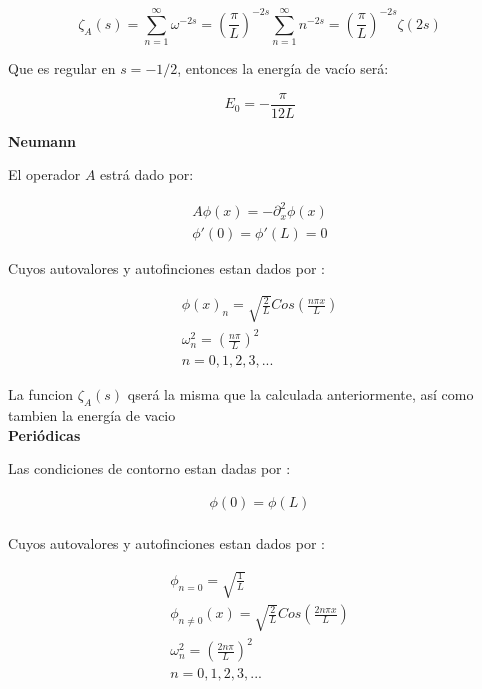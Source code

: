 \begin{equation}
\zeta _A (s) = 
\sum _{n=1} ^{\infty} \omega ^{-2s} =  
\left( \frac{\pi}{L} \right) ^{-2s} \sum _{n=1} ^{\infty} n ^{-2s} = 
\left( \frac{\pi}{L} \right) ^{-2s} \zeta (2s)
\end{equation}

Que es regular en $s=-1/2$, entonces la energía de vacío será:

\begin{equation}
E _0 = - \frac{\pi}{12 L}
\end{equation}

\textbf{Neumann}

El operador $A$ estrá dado por:

\begin{equation}
\begin{array}{c}
	A \phi (x) = - \partial _x ^2 \phi (x) \\
    \phi ' (0) = \phi ' (L) = 0 
\end{array}
\end{equation}



Cuyos autovalores y autofinciones estan dados por  : 

\begin{equation}
\begin{array}{c}
	\phi (x) _n = \sqrt{\frac{2}{L}} Cos( \frac{n \pi x}{L} ) \\
	\omega _n ^2 = \left( \frac{n \pi }{L} \right) ^2 \\
	n = 0,1,2,3, ...
\end{array}
\end{equation}

La funcion $\zeta _A (s)$ qserá la misma que la calculada anteriormente, así como tambien la energía de vacio \\

\textbf{Periódicas}

Las condiciones de contorno estan dadas por : 

\begin{equation}
\begin{array}{c}
    \phi (0) = \phi (L)  \\ 
\end{array}
\end{equation}

Cuyos autovalores y autofinciones estan dados por  : 

\begin{equation}
\begin{array}{c}
	\phi _{n=0} = \sqrt{\frac{1}{L}} \\ 
	\phi _{n \neq 0 } (x) = \sqrt{\frac{2}{L}} Cos( \frac{2 n \pi x}{L} ) \\
	\omega _n ^2 = \left( \frac{2 n \pi }{L} \right) ^2 \\
	n = 0,1,2,3, ...
\end{array}
\end{equation}

